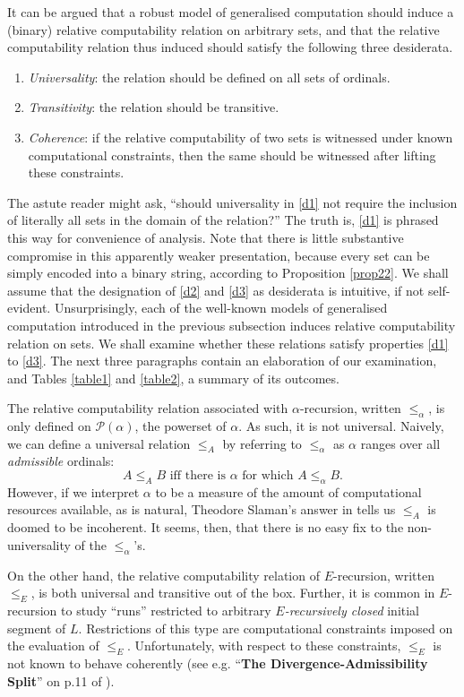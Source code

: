 \documentclass[12pt, twoside]{memoir}
\numberwithin{equation}{section}
\theoremstyle{definition}
\theoremstyle{remark}
\theoremstyle{definition}
\theoremstyle{definition}
\theoremstyle{definition}
\theoremstyle{remark}
\begin{document}
It can be argued that a robust model of generalised computation should induce a (binary) relative computability relation on arbitrary sets, and that the relative computability relation thus induced should satisfy the following three desiderata.
\begin{enumerate}[leftmargin=40pt, label=(D\arabic*)]
    \item\label{d1} \textit{Universality}: the relation should be defined on all sets of ordinals.
    \item\label{d2} \textit{Transitivity}: the relation should be transitive.
    \item\label{d3} \textit{Coherence}: if the relative computability of two sets is witnessed under known computational constraints, then the same should be witnessed after lifting these constraints.
\end{enumerate}
The astute reader might ask, ``should universality in \ref{d1} not require the inclusion of literally all sets in the domain of the relation?'' The truth is, \ref{d1} is phrased this way for convenience of analysis. Note that there is little substantive compromise in this apparently weaker presentation, because every set can be simply encoded into a binary string, according to Proposition \ref{prop22}. We shall assume that the designation of \ref{d2} and \ref{d3} as desiderata is intuitive, if not self-evident. Unsurprisingly, each of the well-known models of generalised computation introduced in the previous subsection induces relative computability relation on sets. We shall examine whether these relations satisfy properties \ref{d1} to \ref{d3}. The next three paragraphs contain an elaboration of our examination, and Tables \ref{table1} and \ref{table2}, a summary of its outcomes.

The relative computability relation associated with $\alpha$-recursion, written $\leq_{\alpha}$, is only defined on $\mathcal{P}(\alpha)$, the powerset of $\alpha$. As such, it is not universal. Naively, we can define a universal relation $\leq_A$ by referring to $\leq_{\alpha}$ as $\alpha$ ranges over all \textit{admissible} ordinals: $$A \leq_A B \text{ iff there is } \alpha \text{ for which } A \leq_{\alpha} B \text{.}$$ However, if we interpret $\alpha$ to be a measure of the amount of computational resources available, as is natural, Theodore Slaman's answer in \cite{slaman} tells us $\leq_A$ is doomed to be incoherent. It seems, then, that there is no easy fix to the non-universality of the $\leq_{\alpha}$'s.

On the other hand, the relative computability relation of $E$-recursion, written $\leq_E$, is both universal and transitive out of the box. Further, it is common in $E$-recursion to study ``runs'' restricted to arbitrary $E$\textit{-recursively closed} initial segment of $L$. Restrictions of this type are computational constraints imposed on the evaluation of $\leq_E$. Unfortunately, with respect to these constraints, $\leq_E$ is not known to behave coherently (see e.g. ``\textbf{The Divergence-Admissibility Split}'' on p.11 of \cite{sackserec}).
\end{document}
